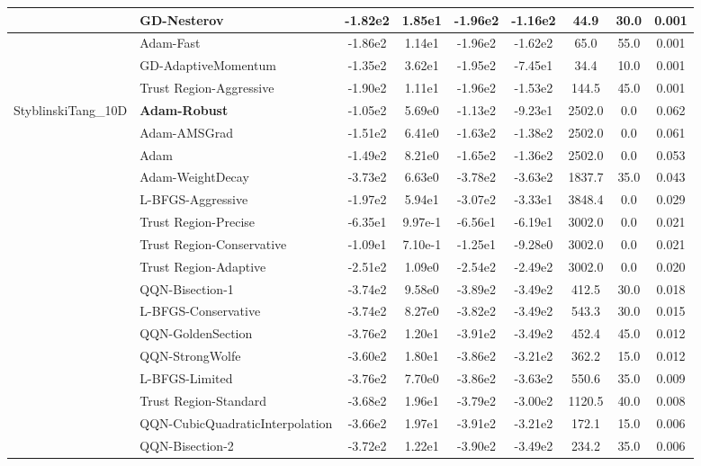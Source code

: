 \documentclass[10pt]{article}
\begin{document}
\begin{longtable}{|l|l|c|c|c|c|c|c|c|}
\hline
 & GD-Nesterov & -1.82e2 & 1.85e1 & -1.96e2 & -1.16e2 & 44.9 & 30.0 & 0.001 \\
\hline
 & Adam-Fast & -1.86e2 & 1.14e1 & -1.96e2 & -1.62e2 & 65.0 & 55.0 & 0.001 \\
\hline
 & GD-AdaptiveMomentum & -1.35e2 & 3.62e1 & -1.95e2 & -7.45e1 & 34.4 & 10.0 & 0.001 \\
\hline
 & Trust Region-Aggressive & -1.90e2 & 1.11e1 & -1.96e2 & -1.53e2 & 144.5 & 45.0 & 0.001 \\
StyblinskiTang\_10D & \textbf{Adam-Robust} & -1.05e2 & 5.69e0 & -1.13e2 & -9.23e1 & 2502.0 & 0.0 & 0.062 \\
\hline
 & Adam-AMSGrad & -1.51e2 & 6.41e0 & -1.63e2 & -1.38e2 & 2502.0 & 0.0 & 0.061 \\
\hline
 & Adam & -1.49e2 & 8.21e0 & -1.65e2 & -1.36e2 & 2502.0 & 0.0 & 0.053 \\
\hline
 & Adam-WeightDecay & -3.73e2 & 6.63e0 & -3.78e2 & -3.63e2 & 1837.7 & 35.0 & 0.043 \\
\hline
 & L-BFGS-Aggressive & -1.97e2 & 5.94e1 & -3.07e2 & -3.33e1 & 3848.4 & 0.0 & 0.029 \\
\hline
 & Trust Region-Precise & -6.35e1 & 9.97e-1 & -6.56e1 & -6.19e1 & 3002.0 & 0.0 & 0.021 \\
\hline
 & Trust Region-Conservative & -1.09e1 & 7.10e-1 & -1.25e1 & -9.28e0 & 3002.0 & 0.0 & 0.021 \\
\hline
 & Trust Region-Adaptive & -2.51e2 & 1.09e0 & -2.54e2 & -2.49e2 & 3002.0 & 0.0 & 0.020 \\
\hline
 & QQN-Bisection-1 & -3.74e2 & 9.58e0 & -3.89e2 & -3.49e2 & 412.5 & 30.0 & 0.018 \\
\hline
 & L-BFGS-Conservative & -3.74e2 & 8.27e0 & -3.82e2 & -3.49e2 & 543.3 & 30.0 & 0.015 \\
\hline
 & QQN-GoldenSection & -3.76e2 & 1.20e1 & -3.91e2 & -3.49e2 & 452.4 & 45.0 & 0.012 \\
\hline
 & QQN-StrongWolfe & -3.60e2 & 1.80e1 & -3.86e2 & -3.21e2 & 362.2 & 15.0 & 0.012 \\
\hline
 & L-BFGS-Limited & -3.76e2 & 7.70e0 & -3.86e2 & -3.63e2 & 550.6 & 35.0 & 0.009 \\
\hline
 & Trust Region-Standard & -3.68e2 & 1.96e1 & -3.79e2 & -3.00e2 & 1120.5 & 40.0 & 0.008 \\
\hline
 & QQN-CubicQuadraticInterpolation & -3.66e2 & 1.97e1 & -3.91e2 & -3.21e2 & 172.1 & 15.0 & 0.006 \\
\hline
 & QQN-Bisection-2 & -3.72e2 & 1.22e1 & -3.90e2 & -3.49e2 & 234.2 & 35.0 & 0.006 \\

\end{longtable}
\end{document}

